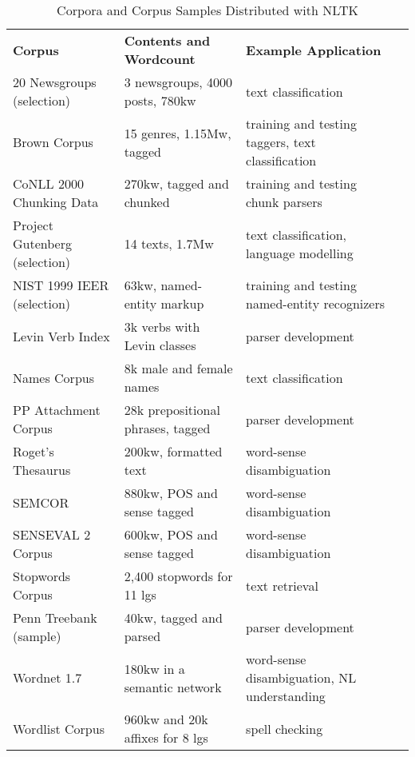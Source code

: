 \documentclass[11pt]{article}
\begin{document}
\begin{table*}
\small\noindent
\begin{boxedminipage}{\linewidth}
\begin{tabular}{llll}
\textbf{Corpus} &
\textbf{Contents and Wordcount} &
\textbf{Example Application} \\

20 Newsgroups (selection) &
3 newsgroups, 4000 posts, 780kw &
text classification \\

Brown Corpus &
15 genres, 1.15Mw, tagged &
training and testing taggers, text classification \\

CoNLL 2000 Chunking Data &
270kw, tagged and chunked &
training and testing chunk parsers \\

Project Gutenberg (selection) &
14 texts, 1.7Mw &
text classification, language modelling \\

NIST 1999 IEER (selection) &
63kw, named-entity markup &
training and testing named-entity recognizers \\

Levin Verb Index &
3k verbs with Levin classes &
parser development \\

Names Corpus &
8k male and female names &
text classification \\

PP Attachment Corpus &
28k prepositional phrases, tagged &
parser development \\

Roget's Thesaurus &
200kw, formatted text &
word-sense disambiguation \\

SEMCOR &
880kw, POS and sense tagged &
word-sense disambiguation \\

SENSEVAL 2 Corpus &
600kw, POS and sense tagged &
word-sense disambiguation \\

Stopwords Corpus &
2,400 stopwords for 11 lgs &
text retrieval \\

Penn Treebank (sample) &
40kw, tagged and parsed &
parser development \\

Wordnet 1.7 &
180kw in a semantic network &
word-sense disambiguation, NL understanding \\

Wordlist Corpus &
960kw and 20k affixes for 8 lgs &
spell checking
 \\
\end{tabular}
\caption{Corpora and Corpus Samples Distributed with NLTK}\label{tab:data}
\end{boxedminipage}
\end{table*}
\end{document}
